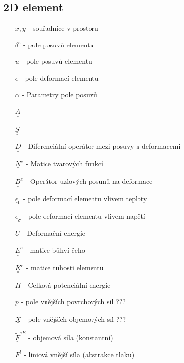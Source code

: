\documentclass[10pt,oneside]{article}
\newcommand{\ul}[1]{\underline{#1}}
\newcommand{\ull}[1]{\underline{\underline{#1}}}
\begin{document}
\newpage
\subsection*{2D element}
\begin{multicols}{2}
\begin{itemize}
	\item [$x,y$] - souřadnice v prostoru
	\item [$\ul{\delta}^e$] - pole posuvů elementu
	\\[-.5em]
	\item [$\ul{u}$] - pole posuvů elementu
	\item [$\ul{\epsilon}$] - pole deformací elementu
	\\[-.5em]
	\item [$\ul{\alpha}$] - Parametry pole posuvů
	\item [$\ull{A}$] - 
	\item [$\ull{S}$] -
	\item [$\ull{D}$] - Diferenciální operátor mezi posuvy a deformacemi
	\\[-.5em]
	\item [$\ull{N}^e$] - Matice tvarových funkcí
	\item [$\ull{B}^e$] - Operátor uzlových posunů na deformace
	\\[-.5em]
	\item [$\ul{\epsilon}_0$] - pole deformací elementu vlivem teploty
	\item [$\ul{\epsilon}_\sigma$] - pole deformací elementu vlivem napětí
	\\[-.5em]
	\item [$U$] - Deformační energie
	\item [$\ull{E}^e$] - matice bůhví čeho 
	\item [$\ull{K}^e$] - matice tuhosti elementu
	\\[-.5em]
	\item [$\Pi$] - Celková potenciální energie
	\item [$\ul{p}$] - pole vnějších povrchových sil ???
	\item [$\ul{X}$] - pole vnějších objemových sil ???
	\\[-.5em]
	\item [$\ul{\tilde{F}}^{eE}$] - objemová síla (konstantní)
	\item [$\ul{F}^{l}$] - liniová vnější síla (abstrakce tlaku)
\end{itemize}
\end{multicols}
\end{document}
